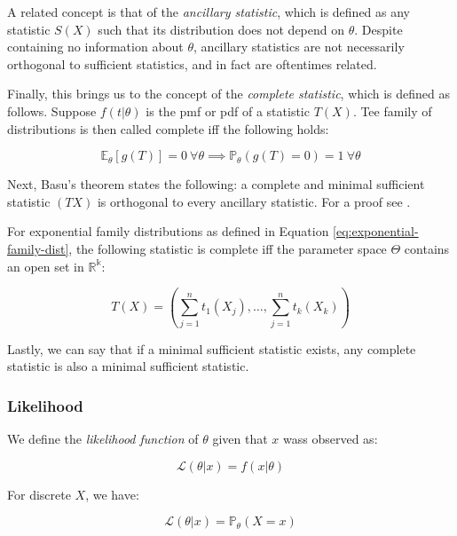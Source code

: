 \documentclass{report}
\begin{document}
A related concept is that of the \textit{ancillary statistic}, which is defined as any statistic $S(X)$ such that its distribution does not depend on $\theta$. Despite containing no information about $\theta$, ancillary statistics are not necessarily orthogonal to sufficient statistics, and in fact are oftentimes related. 

Finally, this brings us to the concept of the \textit{complete statistic}, which is defined as follows. Suppose $f(t|\theta)$ is the \gls{pmf} or \gls{pdf} of a statistic $T(X)$. Tee family of distributions is then called complete \gls{iff} the following holds:

\begin{equation}\label{eq:complete-statistic}
    \mathbb{E}_\theta[g(T)] = 0 \: \forall \theta \implies \mathbb{P}_\theta(g(T) = 0) = 1 \: \forall \theta 
\end{equation}

Next, Basu's theorem states the following: a complete and minimal sufficient statistic $(TX)$ is orthogonal to every ancillary statistic. For a proof see \cite[Chapter~6.2.4]{casella_statistical_2002}. 

For exponential family distributions as defined in Equation \ref{eq:exponential-family-dist}, the following statistic is complete \gls{iff} the parameter space $\Theta$ contains an open set in $\mathbb{R^k}$:

\begin{equation}\label{eq:complete-statistic-exponential-family}
    T(X) = \left(\sum_{j=1}^n t_1(X_j), \dots, \sum_{j=1}^n t_k(X_k)\right)
\end{equation}

Lastly, we can say that if a minimal sufficient statistic exists, any complete statistic is also a minimal sufficient statistic. 

\subsubsection{Likelihood}

We define the \textit{likelihood function} of $\theta$ given that $x$ wass observed as:

\begin{equation}\label{eq:likelihood-function}
    \mathcal{L}(\theta|x) = f(x|\theta)
\end{equation}

For discrete $X$, we have:

\begin{equation}\label{eq:likelihood-function-discrete}
    \mathcal{L}(\theta|x) = \mathbb{P}_\theta(X = x)
\end{equation}
\end{document}
